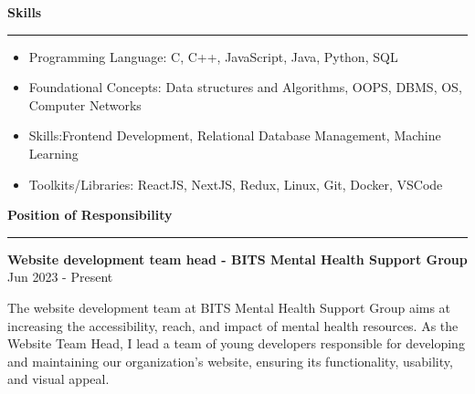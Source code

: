 \documentclass[a4paper,12pt]{report}
\begin{document}
\noindent 
\textbf{Skills} \par
\vspace{2pt}
\hrule
\vspace{6pt}
\noindent 
\begin{itemize}[noitemsep,topsep=0pt]
\item {\fontsize{12pt}{12pt}\selectfont Programming Language:}  C, C++, JavaScript, Java, Python, SQL \par
\noindent 
\item {\fontsize{12pt}{12pt}\selectfont Foundational Concepts:} Data structures and Algorithms, OOPS, DBMS, OS, Computer Networks \par
\noindent 
\item {\fontsize{12pt}{12pt}\selectfont Skills:}Frontend Development, Relational Database Management, Machine Learning \par
\noindent 
\item {\fontsize{12pt}{12pt}\selectfont Toolkits/Libraries:} ReactJS, NextJS, Redux, Linux, Git, Docker, VSCode \par
\end{itemize}
\par
\vspace{9pt}
\noindent
\textbf{Position of Responsibility} \par
\vspace{2pt}
\hrule
\vspace{6pt}
\noindent 
\textbf{{\color{black}Website development team head - BITS Mental Health Support Group}} \hfill  {\fontsize{12pt}{12pt}\selectfont Jun 2023 - Present} \par
\noindent
The website development team at BITS Mental Health Support Group aims at increasing the accessibility, reach, and impact of mental health resources. As the Website Team Head, I lead a team of young developers responsible for developing and maintaining our organization's website, ensuring its functionality, usability, and visual appeal. 
\end{document}
